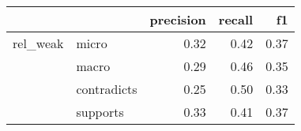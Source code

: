\begin{tabular}{llrrr}
\toprule
         &          &  precision &  recall &   f1 \\
\midrule
rel\_weak & micro &       0.32 &    0.42 & 0.37 \\
         & macro &       0.29 &    0.46 & 0.35 \\
         & contradicts &       0.25 &    0.50 & 0.33 \\
         & supports &       0.33 &    0.41 & 0.37 \\
\bottomrule
\end{tabular}

